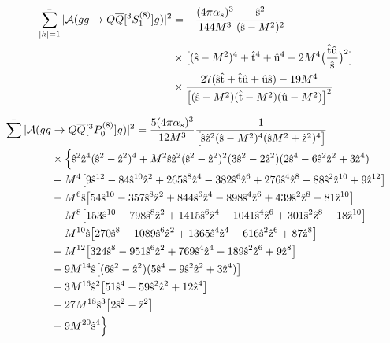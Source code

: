\documentclass[aps,prc,preprint,superscriptaddress,showpacs,showkeys,amsmath]{revtex4-1}
\begin{document}
\begin{itemize}
\begin{equation}
\begin{split}
\mathop{{\bar{\sum_{|h|=1}}}} | {\cal A}(g g \to Q{\overline Q}[ ^3S_1^{(8)}] g) |^2 &= -{(4\pi {\alpha_{s}})^3 \over 144 M^3} {\hat{\rm s}^2 \over (\hat{\rm s}-M^2)^2}\\ 
                                                                  &\times \bigl[(\hat{\rm s}-M^2)^4+\hat{\rm t}^4+\hat{\rm u}^4+2 M^4 \bigl({\hat{\rm t}\hat{\rm u} \over \hat{\rm s}}\bigr)^2 \bigr]\\ 
                                                                & \times {27(\hat{\rm s}\hat{\rm t}+\hat{\rm t}\hat{\rm u}+\hat{\rm u}\hat{\rm s})-19M^4 \over \bigl[(\hat{\rm s}-M^2)(\hat{\rm t}-M^2)(\hat{\rm u}-M^2)\bigr]^2}
\end{split}  
\end{equation}

\begin{equation}
\begin{split}
\mathop{{\bar{\sum}}} | {\cal A}(gg & \to Q{\overline Q}[ ^3P_0^{(8)}] g) |^2 = {5 (4\pi {\alpha_{s}})^3 \over 12 M^3} \frac{1}{\bigl[\hat{\rm s} \hat{\rm z}^2 (\hat{\rm s}-M^2)^4 (\hat{\rm s} M^2 + \hat{\rm z}^2)^4 \bigr]}\\
                                                           & \times \Bigl\{\hat{\rm s}^2 \hat{\rm z}^4 (\hat{\rm s}^2-\hat{\rm z}^2)^4+ M^2 \hat{\rm s} \hat{\rm z}^2 (\hat{\rm s}^2-\hat{\rm z}^2)^2 (3\hat{\rm s}^2-2\hat{\rm z}^2)(2\hat{\rm s}^4 - 6 \hat{\rm s}^2 \hat{\rm z}^2 + 3 \hat{\rm z}^4)\\
                                                           & + M^4 \bigl[ 9\hat{\rm s}^{12} - 84 \hat{\rm s}^{10} \hat{\rm z}^2 + 265 \hat{\rm s}^8 \hat{\rm z}^4  - 382 \hat{\rm s}^6 \hat{\rm z}^6 + 276 \hat{\rm s}^4 \hat{\rm z}^8  - 88 \hat{\rm s}^2 \hat{\rm z}^{10}+ 9 \hat{\rm z}^{12} \bigr]\\ 
                                                           & - M^6 \hat{\rm s} \bigl[ 54 \hat{\rm s}^{10} - 357 \hat{\rm s}^8 \hat{\rm z}^2  + 844 \hat{\rm s}^6 \hat{\rm z}^4 - 898 \hat{\rm s}^4 \hat{\rm z}^6 + 439 \hat{\rm s}^2 \hat{\rm z}^8- 81 \hat{\rm z}^{10} \bigr] \\
                                                           & + M^8 \bigl[ 153 \hat{\rm s}^{10} - 798 \hat{\rm s}^8 \hat{\rm z}^2 + 1415 \hat{\rm s}^6 \hat{\rm z}^4 - 1041 \hat{\rm s}^4 \hat{\rm z}^6 + 301 \hat{\rm s}^2 \hat{\rm z}^8 - 18 \hat{\rm z}^{10} \bigr] \\
                                                           & -M^{10} \hat{\rm s} \bigl[ 270 \hat{\rm s}^8 - 1089 \hat{\rm s}^6 \hat{\rm z}^2 + 1365 \hat{\rm s}^4 \hat{\rm z}^4 - 616 \hat{\rm s}^2 \hat{\rm z}^6 + 87 \hat{\rm z}^8 \bigr] \\
                                                           & + M^{12} \bigl[ 324 \hat{\rm s}^8 - 951 \hat{\rm s}^6 \hat{\rm z}^2 + 769 \hat{\rm s}^4 \hat{\rm z}^4 - 189 \hat{\rm s}^2 \hat{\rm z}^6 + 9 \hat{\rm z}^8 \bigr] \\
                                                           & - 9 M^{14} \hat{\rm s} \bigl[ (6 \hat{\rm s}^2 - \hat{\rm z}^2) (5 \hat{\rm s}^4 - 9 \hat{\rm s}^2 \hat{\rm z}^2 + 3 \hat{\rm z}^4) \bigr]\\
                                                           & + 3 M^{16} \hat{\rm s}^2 \bigl[51 \hat{\rm s}^4 - 59 \hat{\rm s}^2 \hat{\rm z}^2 + 12 \hat{\rm z}^4\bigr]\\
                                                           & - 27 M^{18} \hat{\rm s}^3 \bigl[2\hat{\rm s}^2 - \hat{\rm z}^2 \bigr]\\
                                                           & + 9 M^{20} \hat{\rm s}^4 \Bigr\} 
\end{split}  
\end{equation}


\end{itemize}
\end{document}
